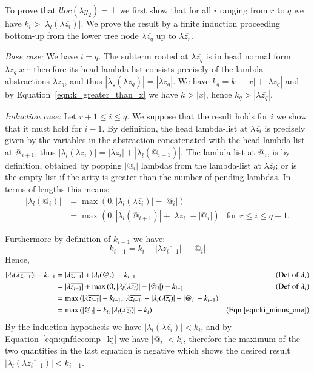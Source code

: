 \documentclass{elsarticle}
\theoremstyle{plain}
\theoremstyle{definition}
\begin{document}
\begin{enumerate}
To prove that $lloc(\lambda\overline{y_2}) =\bot$ we first show that for all $i$ ranging from $r$ to $q$ we have
 $k_i>|\lambda_l(\lambda\overline{z_i})|$. We prove the result by a finite induction proceeding bottom-up from the lower tree node
 $\lambda\overline{z_q}$ up to $\lambda\overline{z_r}$.

\emph{Base case:} We have $i=q$. The subterm
rooted at $\lambda\overline{z_q}$ is in head normal form
$\lambda\overline{z_q}. x \cdots$ therefore its head lambda-list consists precisely of the lambda abstractions $\lambda\overline{z_q}$, and thus
$|\lambda_s(\lambda\overline{z_q})| = |\lambda\overline{z_q}|$.
We have $k_q = k -|x| + |\lambda\overline{z_q}|$ and by Equation~\ref{eqn:k_greater_than_x} we have $k>|x|$, hence $k_q >|\lambda\overline{z_q}|$.


\emph{Induction case:} Let $r+1\leq i \leq q$. We suppose that the result holds for $i$ we show that it must hold for $i-1$. By definition, the head lambda-list at $\lambda\overline{z_i}$ is precisely given by the variables in the abstraction concatenated with the head lambda-list at $@_{i+1}$, thus $|\lambda_l(\lambda\overline{z_i})| =
|\lambda\overline{z_i}| + |\lambda_l(@_{i+1})|$. The lambda-list at $@_i$, is by definition, obtained by popping $|@_i|$ lambdas from the lambda-list at $\lambda\overline{z_i}$; or is the empty list if the arity is greater than the number of pending lambdas. In terms of lengths this means:
\begin{align*}
    |\lambda_l(@_i)| &= \max(0, |\lambda_l(\lambda\overline{z_i})| - |@_i|) \\
     &= \max\left( 0, |\lambda_l(@_{i+1})| + |\lambda\overline{z_i}| - |@_i| \right) & \mbox{for $r\leq i \leq q-1$.}
\end{align*}

Furthermore by definition of $k_{i-1}$ we have:
\begin{equation}
k_{i-1} = k_i + |\lambda\overline{z_{i-1}}| - |@_i| \label{eqn:ki_minus_one}
\end{equation}
Hence,
\begin{align*}
    |\lambda_l(\lambda\overline{z_{i-1}})| - k_{i-1}
    &= |\lambda\overline{z_{i-1}}| +|\lambda_l(@_i)| - k_{i-1} &\mbox{(Def~of $\lambda_l$)}\\
    &= |\lambda\overline{z_{i-1}}| + \max\left( 0, |\lambda_l(\lambda\overline{z_i})| - |@_i| \right) - k_{i-1} &\mbox{(Def~of $\lambda_l$)}\\
    &= \max\left( |\lambda\overline{z_{i-1}}| - k_{i-1},    |\lambda\overline{z_{i-1}}| + |\lambda_l(\lambda\overline{z_i})| - |@_i| - k_{i-1} \right) \\
    &= \max\left(  |@_i|- k_i, |\lambda_l(\lambda\overline{z_i})| - k_i \right) &\mbox{(Eqn~\ref{eqn:ki_minus_one})}
\end{align*}
By the induction hypothesis we have $|\lambda_l(\lambda\overline{z_i})| < k_i$, and by Equation~\ref{eqn:qnfdecomp_kj} we have $ |@_i|< k_i$, therefore the maximum of the two quantities in the last equation is negative which shows
the desired result $|\lambda_l(\lambda\overline{z_{i-1}})| < k_{i-1}$.


\end{enumerate}
\end{document}
